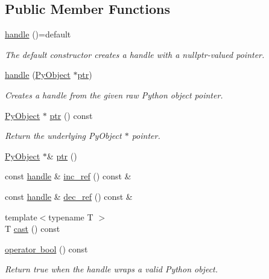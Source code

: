 \subsection*{Public Member Functions}
\begin{DoxyCompactItemize}
\item 
\mbox{\hyperlink{classhandle_a53ba30cccfb1cabee421fd4ea555cf44}{handle}} ()=default
\begin{DoxyCompactList}\small\item\em The default constructor creates a handle with a {\ttfamily nullptr}-\/valued pointer. \end{DoxyCompactList}\item 
\mbox{\hyperlink{classhandle_a99eb912e1b9b823bc447980a16772584}{handle}} (\mbox{\hyperlink{_python27_2object_8h_aadc84ac7aed2cfa6f20c25f62bf3dac7}{Py\+Object}} $\ast$\mbox{\hyperlink{classhandle_afcd412ba4cbffd7d1e3c9338746b2682}{ptr}})
\begin{DoxyCompactList}\small\item\em Creates a {\ttfamily handle} from the given raw Python object pointer. \end{DoxyCompactList}\item 
\mbox{\hyperlink{_python27_2object_8h_aadc84ac7aed2cfa6f20c25f62bf3dac7}{Py\+Object}} $\ast$ \mbox{\hyperlink{classhandle_afcd412ba4cbffd7d1e3c9338746b2682}{ptr}} () const
\begin{DoxyCompactList}\small\item\em Return the underlying {\ttfamily Py\+Object $\ast$} pointer. \end{DoxyCompactList}\item 
\mbox{\hyperlink{_python27_2object_8h_aadc84ac7aed2cfa6f20c25f62bf3dac7}{Py\+Object}} $\ast$\& \mbox{\hyperlink{classhandle_aba369bca41a28327a0812fddce26e95a}{ptr}} ()
\item 
const \mbox{\hyperlink{classhandle}{handle}} \& \mbox{\hyperlink{classhandle_ab9c5f2cbecb0b37f53765b1c501b7451}{inc\+\_\+ref}} () const \&
\item 
const \mbox{\hyperlink{classhandle}{handle}} \& \mbox{\hyperlink{classhandle_a03747f7b62a7b61eb7d9d1df25bfa7c4}{dec\+\_\+ref}} () const \&
\item 
{\footnotesize template$<$typename T $>$ }\\T \mbox{\hyperlink{classhandle_a8158ff37b59a73d48140ab4d718316b9}{cast}} () const
\item 
\mbox{\hyperlink{classhandle_a2c60694c460b2227f2a00c7b873d7436}{operator bool}} () const
\begin{DoxyCompactList}\small\item\em Return {\ttfamily true} when the {\ttfamily handle} wraps a valid Python object. \end{DoxyCompactList}\item 

\end{DoxyCompactItemize}
